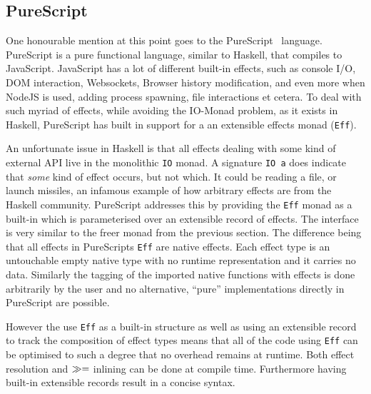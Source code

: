 \subsection{PureScript}

One honourable mention at this point goes to the PureScript~\cite{purescript}
language. PureScript is a pure functional language, similar to Haskell, that
compiles to JavaScript. JavaScript has a lot of different built-in effects, such
as console I/O, DOM interaction, Websockets, Browser history modification, and
even more when NodeJS is used, adding process spawning, file interactions et
cetera. To deal with such myriad of effects, while avoiding the IO-Monad
problem, as it exists in Haskell, PureScript has built in support for a an
extensible effects monad (\texttt{Eff}).

An unfortunate issue in Haskell is that all effects dealing with some kind of
external API live in the monolithic \texttt{IO} monad. A signature \texttt{IO a}
does indicate that \emph{some} kind of effect occurs, but not which. It could be
reading a file, or launch missiles, an infamous example of how arbitrary effects
are from the Haskell community. PureScript addresses this by providing the
\texttt{Eff} monad as a built-in which is parameterised over an extensible
record of effects. The interface is very similar to the freer monad from the
previous section. The difference being that all effects in PureScripts
\texttt{Eff} are native effects. Each effect type is an untouchable empty native
type with no runtime representation and it carries no data. Similarly the
tagging of the imported native functions with effects is done arbitrarily by the
user and no alternative, ``pure'' implementations directly in PureScript are
possible.

However the use \texttt{Eff} as a built-in structure as well as using an
extensible record to track the composition of effect types means that all of the
code using \texttt{Eff} can be optimised to such a degree that no overhead
remains at runtime. Both effect resolution and $\gg=$ inlining can be done at
compile time. Furthermore having built-in extensible records result in a concise
syntax.
